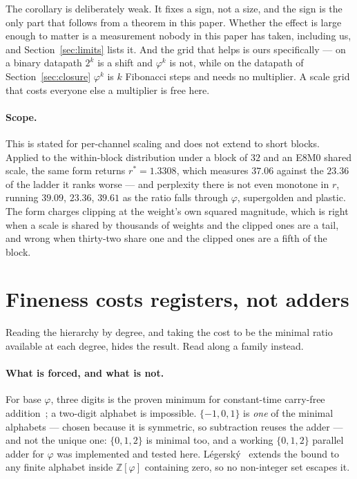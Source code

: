 The corollary is deliberately weak. It fixes a sign, not a size, and the sign is
the only part that follows from a theorem in this paper. Whether the effect is
large enough to matter is a measurement nobody in this paper has taken, including
us, and Section~\ref{sec:limits} lists it.
And the grid that helps is ours specifically --- on a binary datapath $2^{k}$ is a shift and
$\varphi^{k}$ is not, while on the datapath of Section~\ref{sec:closure}
$\varphi^{k}$ is $k$ Fibonacci steps and needs no multiplier. A scale grid that
costs everyone else a multiplier is free here.

\paragraph{Scope.} This is stated for per-channel scaling and does not extend to
short blocks. Applied to the within-block distribution under a block of $32$ and
an E8M0 shared scale, the same form returns $r^{*}=1.3308$, which measures
$37.06$ against the $23.36$ of the ladder it ranks worse --- and perplexity
there is not even monotone in $r$, running $39.09$, $23.36$, $39.61$ as the
ratio falls through $\varphi$, supergolden and plastic. The form charges
clipping at the weight's own squared magnitude, which is right when a scale is
shared by thousands of weights and the clipped ones are a tail, and wrong when
thirty-two share one and the clipped ones are a fifth of the block.


\section{Fineness costs registers, not adders}\label{sec:oneadder}



Reading the hierarchy by degree, and taking the cost to be the minimal ratio
available at each degree, hides the result. Read along a family instead.

\paragraph{What is forced, and what is not.} For base $\varphi$, three digits is
the proven minimum for constant-time carry-free addition~\cite{frougny2011,
frougny2013}; a two-digit alphabet is impossible. $\{-1,0,1\}$ is \emph{one} of
the minimal alphabets --- chosen because it is symmetric, so subtraction reuses
the adder --- and not the unique one: $\{0,1,2\}$ is minimal too, and a working
$\{0,1,2\}$ parallel adder for $\varphi$ was implemented and tested here.
L\'egersk\'y~\cite{legersky2018} extends the bound to any finite alphabet inside
$\mathbb{Z}[\varphi]$ containing zero, so no non-integer set escapes it.


